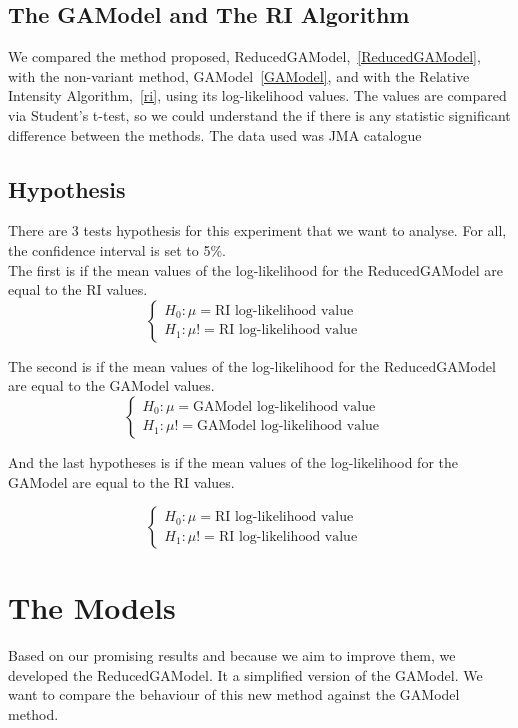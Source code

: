 \subsection{The GAModel and The RI Algorithm}
We compared the method proposed, ReducedGAModel,~\ref{ReducedGAModel}, with the non-variant method, GAModel~\ref{GAModel}, and with the Relative Intensity Algorithm,~\ref{ri}, using its log-likelihood values. The values are compared via Student’s t-test, so we could understand the if there is any statistic significant difference between the methods. The data used was JMA catalogue\\

\subsection{Hypothesis}
There are 3 tests hypothesis for this experiment that we want to analyse. For all, the confidence interval is set to 5\%.\\

The first is if the mean values of the log-likelihood for the ReducedGAModel are equal to the RI values.
$$\begin{cases}
	H_0: \mu = \text{RI log-likelihood value}&\\
	H_1: \mu != \text{RI log-likelihood value}
\end{cases}$$

The second is if the mean values of the log-likelihood for the ReducedGAModel are equal to the GAModel values.
$$\begin{cases}
	H_0: \mu = \text{GAModel log-likelihood value}&\\
	H_1: \mu != \text{GAModel log-likelihood value}
\end{cases}$$

And the last hypotheses is if the mean values of the log-likelihood for the GAModel are equal to the RI values.

$$\begin{cases}
	H_0: \mu = \text{RI log-likelihood value}&\\
	H_1: \mu != \text{RI log-likelihood value}
\end{cases}$$


\section{The Models}

Based on our promising results and because we aim to improve them, we developed the ReducedGAModel. It a simplified version of the GAModel. We want to compare the behaviour of this new method against the GAModel method.\\


